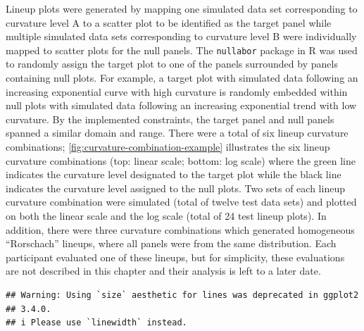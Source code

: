 \documentclass[12pt]{article}
\begin{document}
Lineup plots were generated by mapping one simulated data set
corresponding to curvature level A to a scatter plot to be identified as
the target panel while multiple simulated data sets corresponding to
curvature level B were individually mapped to scatter plots for the null
panels. The \texttt{nullabor} package in R \citep{nullabor} was used to
randomly assign the target plot to one of the panels surrounded by
panels containing null plots. For example, a target plot with simulated
data following an increasing exponential curve with high curvature is
randomly embedded within null plots with simulated data following an
increasing exponential trend with low curvature. By the implemented
constraints, the target panel and null panels spanned a similar domain
and range. There were a total of six lineup curvature combinations;
\cref{fig:curvature-combination-example} illustrates the six lineup
curvature combinations (top: linear scale; bottom: log scale) where the
green line indicates the curvature level designated to the target plot
while the black line indicates the curvature level assigned to the null
plots. Two sets of each lineup curvature combination were simulated
(total of twelve test data sets) and plotted on both the linear scale
and the log scale (total of 24 test lineup plots). In addition, there
were three curvature combinations which generated homogeneous
``Rorschach'' lineups, where all panels were from the same distribution.
Each participant evaluated one of these lineups, but for simplicity,
these evaluations are not described in this chapter and their analysis
is left to a later date.

\begin{verbatim}
## Warning: Using `size` aesthetic for lines was deprecated in ggplot2
## 3.4.0.
## i Please use `linewidth` instead.
\end{verbatim}
\end{document}

